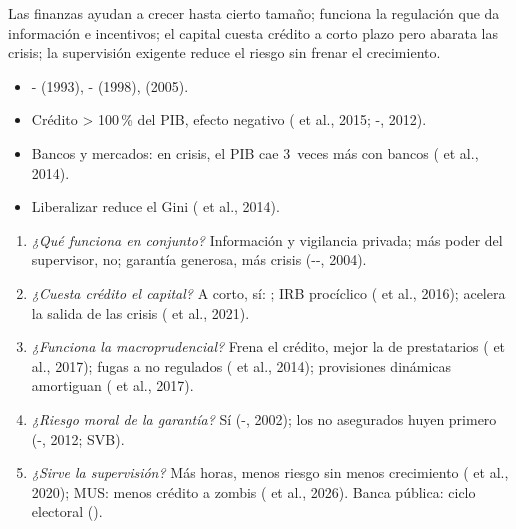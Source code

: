 \documentclass{article}
\begin{document}
\begin{columnas}
\begin{ideaclave}
Las finanzas ayudan a crecer hasta cierto tamaño; funciona la regulación que da información e incentivos; el capital cuesta crédito a corto plazo pero abarata las crisis; la supervisión exigente reduce el riesgo sin frenar el crecimiento.
\end{ideaclave}
\begin{itemize}
\item {}- (1993), - (1998),  (2005).
\item Crédito > 100\,\% del PIB, efecto negativo ( et al., 2015; -, 2012).
\item Bancos y mercados: en crisis, el PIB cae 3~veces más con bancos ( et al., 2014).
\item Liberalizar reduce el Gini ( et al., 2014).
\end{itemize}
\begin{enumerate}
\item \emph{¿Qué funciona en conjunto?} Información y vigilancia privada; más poder del supervisor, no; garantía generosa, más crisis (--, 2004).
\item \emph{¿Cuesta crédito el capital?} A corto, sí: ; IRB procíclico ( et al., 2016); acelera la salida de las crisis ( et al., 2021).
\item \emph{¿Funciona la macroprudencial?} Frena el crédito, mejor la de prestatarios ( et al., 2017); fugas a no regulados ( et al., 2014); provisiones dinámicas amortiguan ( et al., 2017).
\item \emph{¿Riesgo moral de la garantía?} Sí (-, 2002); los no asegurados huyen primero (-, 2012; SVB).
\item \emph{¿Sirve la supervisión?} Más horas, menos riesgo sin menos crecimiento ( et al., 2020); MUS: menos crédito a zombis ( et al., 2026). Banca pública: ciclo electoral ().
\end{enumerate}

\end{columnas}
\end{document}
